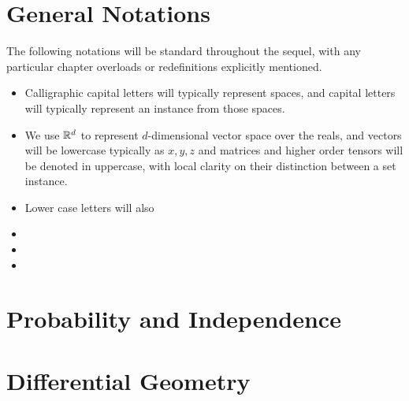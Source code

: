 \section{General Notations}
The following notations will be standard throughout the sequel, with any particular chapter overloads or redefinitions explicitly mentioned.
\begin{itemize}
\item Calligraphic capital letters will typically represent spaces, and capital letters will typically represent an instance from those spaces.


\item We use $\mathbb{R}^d$ to represent $d$-dimensional vector space over the reals, and vectors will be lowercase typically as $x,y,z$ and matrices and higher order tensors will be denoted in uppercase, with local clarity on their distinction between a set instance.

\item Lower case letters will also 

\item {}

\item {}%

\item {}

\end{itemize}

\section{Probability and Independence}


\section{Differential Geometry}\label{sec:diffgeom}


